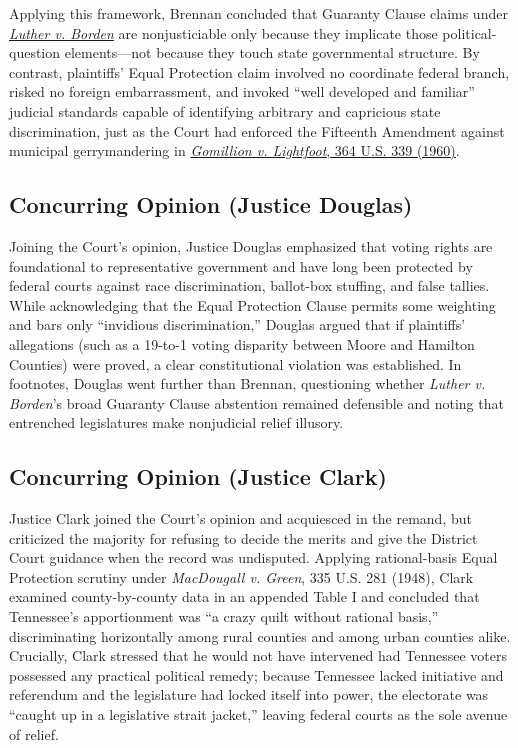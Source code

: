 \documentclass[12pt]{article}
\begin{document}
Applying this framework, Brennan concluded that Guaranty Clause claims under \href{https://supreme.justia.com/cases/federal/us/48/1/}{\textit{Luther v. Borden}} are nonjusticiable only because they implicate those political-question elements---not because they touch state governmental structure. By contrast, plaintiffs' Equal Protection claim involved no coordinate federal branch, risked no foreign embarrassment, and invoked ``well developed and familiar'' judicial standards capable of identifying arbitrary and capricious state discrimination, just as the Court had enforced the Fifteenth Amendment against municipal gerrymandering in \href{https://supreme.justia.com/cases/federal/us/364/339/}{\textit{Gomillion v. Lightfoot}, 364 U.S. 339 (1960)}.

\subsection{Concurring Opinion (Justice Douglas)}

Joining the Court's opinion, Justice Douglas emphasized that voting rights are foundational to representative government and have long been protected by federal courts against race discrimination, ballot-box stuffing, and false tallies. While acknowledging that the Equal Protection Clause permits some weighting and bars only ``invidious discrimination,'' Douglas argued that if plaintiffs' allegations (such as a 19-to-1 voting disparity between Moore and Hamilton Counties) were proved, a clear constitutional violation was established. In footnotes, Douglas went further than Brennan, questioning whether \textit{Luther v. Borden}'s broad Guaranty Clause abstention remained defensible and noting that entrenched legislatures make nonjudicial relief illusory.

\subsection{Concurring Opinion (Justice Clark)}

Justice Clark joined the Court's opinion and acquiesced in the remand, but criticized the majority for refusing to decide the merits and give the District Court guidance when the record was undisputed. Applying rational-basis Equal Protection scrutiny under \textit{MacDougall v. Green}, 335 U.S. 281 (1948), Clark examined county-by-county data in an appended Table I and concluded that Tennessee's apportionment was ``a crazy quilt without rational basis,'' discriminating horizontally among rural counties and among urban counties alike. Crucially, Clark stressed that he would not have intervened had Tennessee voters possessed any practical political remedy; because Tennessee lacked initiative and referendum and the legislature had locked itself into power, the electorate was ``caught up in a legislative strait jacket,'' leaving federal courts as the sole avenue of relief.
\end{document}
